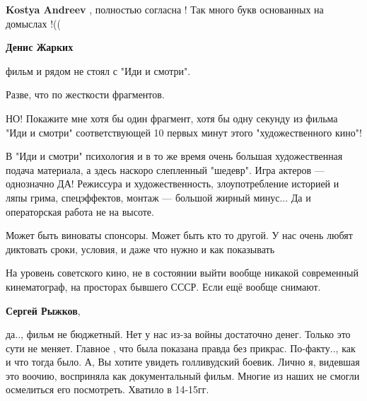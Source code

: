 \begin{itemize}
\begin{itemize}
 
\textbf{Kostya Andreev} , полностью согласна ! Так много букв основанных на домыслах !((
\end{itemize}

 
\textbf{Денис Жарких} 

фильм и рядом не стоял с "Иди и смотри".

Разве, что по жесткости фрагментов.

НО! Покажите мне хотя бы один фрагмент, хотя бы одну секунду из фильма "Иди и
смотри" соответствующей 10 первых минут этого "художественного кино"!

В "Иди и смотри" психология и в то же время очень большая художественная подача
материала, а здесь наскоро слепленный "шедевр". Игра актеров — однозначно ДА!
Режиссура и художественность, злоупотребление историей и ляпы грима,
спецэффектов, монтаж — большой жирный минус... Да и операторская работа не на
высоте.

Может быть виноваты спонсоры. Может быть кто то другой. У нас очень любят
диктовать сроки, условия, и даже что нужно и как показывать

\begin{itemize}


На уровень советского кино, не в состоянии выйти вообще никакой современный
кинематограф, на просторах бывшего СССР. Если ещё вообще снимают.

 
\textbf{Сергей Рыжков}, 

да.., фильм не бюджетный. Нет у нас из-за войны достаточно денег. Только это
сути не меняет. Главное , что была показана правда без прикрас. По-факту.., как
и что тогда было. А, Вы хотите увидеть голливудский боевик. Лично я, видевшая
это воочию, восприняла как документальный фильм. Многие из наших не смогли
осмелиться его посмотреть. Хватило в 14-15гг.


\end{itemize}
\end{itemize}
